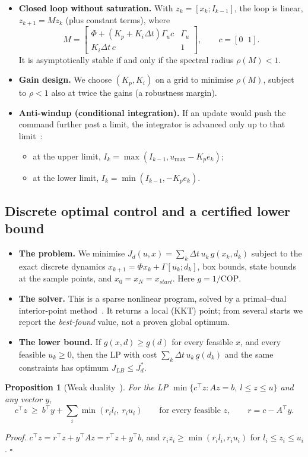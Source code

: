\documentclass[12pt,a4paper]{report}
\newtheorem{proposition}{Proposition}[chapter]
\theoremstyle{definition}
\newcommand{\COP}{\mathrm{COP}}
\begin{document}
\begin{itemize}
\item \textbf{Closed loop without saturation.} With $z_k=[x_k;I_{k-1}]$, the loop is linear, $z_{k+1}=Mz_k$ (plus constant terms), where
\[
M=\begin{bmatrix}\Phi+(K_p+K_i\Delta t)\Gamma_u c&\Gamma_u\\K_i\Delta t\,c&1\end{bmatrix},\qquad c=[0\;\;1].
\]
It is asymptotically stable if and only if the spectral radius $\rho(M)<1$.
\item \textbf{Gain design.} We choose $(K_p,K_i)$ on a grid to minimise $\rho(M)$, subject to $\rho<1$ also at twice the gains (a robustness margin).
\item \textbf{Anti-windup (conditional integration).} If an update would push the command further past a limit, the integrator is advanced only up to that limit~\cite{astrom2021}:
\begin{itemize}
\item at the upper limit, $I_k=\max(I_{k-1},u_{\max}-K_pe_k)$;
\item at the lower limit, $I_k=\min(I_{k-1},-K_pe_k)$.
\end{itemize}
\end{itemize}

\subsection*{Discrete optimal control and a certified lower bound}
\begin{itemize}
\item \textbf{The problem.} We minimise $J_d(u,x)=\sum_k \Delta t\,u_k\,g(x_k,d_k)$ subject to the exact discrete dynamics $x_{k+1}=\Phi x_k+\Gamma[u_k;d_k]$, box bounds, state bounds at the sample points, and $x_0=x_N=x_{start}$. Here $g=1/\COP$.
\item \textbf{The solver.} This is a sparse nonlinear program, solved by a primal--dual interior-point method~\cite{wachter2006}. It returns a local (KKT) point; from several starts we report the \emph{best-found} value, not a proven global optimum.
\item \textbf{The lower bound.} If $g(x,d)\ge \underline g(d)$ for every feasible $x$, and every feasible $u_k\ge0$, then the LP with cost $\sum_k\Delta t\,u_k\,\underline g(d_k)$ and the same constraints has optimum $J_{LB}\le J_d^\ast$.
\end{itemize}

\begin{proposition}[Weak duality~\cite{boyd2004}]\label{prop:wd}
For the LP $\min\{c^\top z: Az=b,\ l\le z\le u\}$ and \emph{any} vector $y$,
\[
c^\top z\ \ge\ b^\top y+\sum_i\min(r_il_i,\ r_iu_i)\qquad\text{for every feasible }z,\qquad r=c-A^\top y.
\]
\end{proposition}
\noindent\emph{Proof.} $c^\top z=r^\top z+y^\top Az=r^\top z+y^\top b$, and $r_iz_i\ge\min(r_il_i,r_iu_i)$ for $l_i\le z_i\le u_i$. \hfill$\square$
\end{document}
